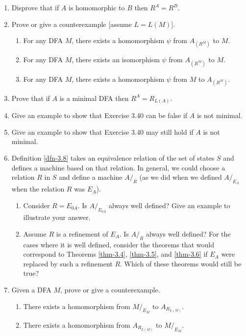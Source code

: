 \begin{enumerate}[{3.}1. ]
\item Disprove that if $A$ is homomorphic to $B$ then $R^A=R^B$.

\item Prove or give a counterexample [assume $L = L(M)$].
\begin{enumerate}
\item For any DFA $M$, there exists a homomorphism $\psi$ from $A_{(R^M)}$ to
$M$.
\item For any DFA $M$, there exists an isomorphism $\psi$ from $A_{(R^M)}$ to
$M$.
\item For any DFA $M$, there exists a homomorphism $\psi$ from $M$ to
$A_{(R^M)}$.
\end{enumerate}

\item Prove that if $A$ is a minimal DFA then $R^A = R_{L(A)}$.

\item Give an example to show that Exercise 3.40 can be false if $A$ is not
minimal.

\item Give an example to show that Exercise 3.40 may still hold if $A$ is not
minimal.

\item Definition \ref{dfn-3.8} takes an equivalence relation of the set of states $S$ and
defines a machine based on that relation. In general, we could choose a relation
$R$ in $S$ and define a machine $A/_R$ (as we did when we defined $A/_{E_A}$
when the relation $R$ was $E_A$).
\begin{enumerate}
\item Consider $R=E_{0A}$. Is $A/_{E_{0A}}$ always well defined? Give an example
to illustrate your answer.
\item Assume $R$ is a refinement of $E_A$. Is $A/_R$ always well defined? For
the cases where it is well defined, consider the theorems that would correspond
to Theorems \ref{thm-3.4}, \ref{thm-3.5}, and \ref{thm-3.6} if $E_A$ were replaced by such a refinement $R$.
Which of these theorems would still be true?
\end{enumerate}

\item Given a DFA $M$, prove or give a counterexample.
\begin{enumerate}
\item There exists a homomorphism from $M/_{E_M}$ to $A_{R_{L(M)}}$.
\item There exists a homomorphism from $A_{R_{L(M)}}$ to $M/_{E_M}$.
\end{enumerate}


\end{enumerate}

